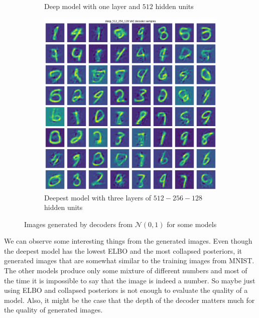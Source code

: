 \documentclass[a4paper,11pt]{article}
\begin{document}
\begin{figure}[ht]
\begin{subfigure}[t]{0.35\textwidth}
        \caption{Deep model with one layer and $512$ hidden units}
    \end{subfigure}
    \begin{subfigure}[t]{0.35\textwidth}
        \includegraphics[width=\textwidth]{../images/decoder_512_256_128.png}
        \caption{Deepest model with three layers of $512-256-128$ hidden units}
    \end{subfigure}
    \caption{Images generated by decoders from $\mathcal{N}(0, 1)$ for some models}
    \label{fig:generations}
\end{figure}

We can observe some interesting things from the generated images.
Even though the deepest model has the lowest ELBO and the most collapsed posteriors, it generated images that are somewhat similar to the training images from MNIST.
The other models produce only some mixture of different numbers and most of the time it is impossible to say that the image is indeed a number.
So maybe just using ELBO and collapsed posteriors is not enough to evaluate the quality of a model.
Also, it might be the case that the depth of the decoder matters much for the quality of generated images.

\clearpage
\end{document}
